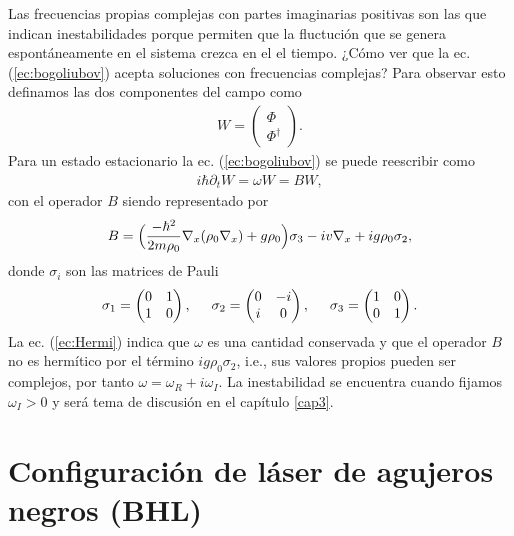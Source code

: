 Las frecuencias propias complejas con partes imaginarias positivas son las que indican inestabilidades porque permiten que la fluctuci\'{o}n que se genera espont\'{a}neamente en el sistema crezca en el el tiempo. ¿C\'{o}mo ver que la  ec. (\ref{ec:bogoliubov}) acepta soluciones con frecuencias complejas? Para observar esto definamos las dos componentes del campo como
\begin{eqnarray}
W=\begin{pmatrix}
\Phi\\
\Phi^{\dagger}

\end{pmatrix}.
\end{eqnarray}
Para un estado estacionario la  ec. (\ref{ec:bogoliubov}) se puede reescribir como
\begin{align}\label{ec:Hermi}
i \hbar \partial_t W= \omega W=B W,
\end{align}
con el operador $B$ siendo representado por
\begin{equation}
B=\Bigl(\frac{-\hbar^2}{2m\rho_0}\nabla_x(\rho_0\nabla_x)+g\rho_0\Bigr)\sigma_3-iv\nabla_x+ig\rho_0\sigma_2,
\end{equation}
donde $\sigma_i$ son las matrices de Pauli
\begin{eqnarray}
\sigma_1=\begin{pmatrix}
0&1\\
1&0
\end{pmatrix}, \hspace{0.5cm}
\sigma_2=\begin{pmatrix}
0&-i\\
i&0
\end{pmatrix}, \hspace{0.5cm}
\sigma_3=\begin{pmatrix}
1&0\\
0&1
\end{pmatrix}.
\end{eqnarray}
La ec. (\ref{ec:Hermi}) indica que $\omega$ es una cantidad conservada y que el operador $B$ no es herm\'{i}tico por el t\'{er}mino $ig\rho_0\sigma_2$, i.e., sus valores propios pueden ser complejos, por tanto $\omega=\omega_R+i\omega_I$. La inestabilidad se encuentra cuando fijamos $\omega_I>0$ y ser\'{a} tema de discusi\'{o}n en el cap\'{i}tulo \ref{cap3}.

\section{Configuraci\'{o}n de l\'{a}ser de agujeros negros (BHL)}\label{BHL}

